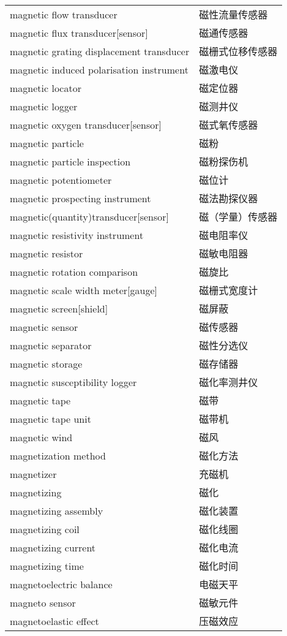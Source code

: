 \documentclass[
]{article}
\begin{document}
\begin{longtable}[]{@{}ll@{}}
magnetic flow transducer & 磁性流量传感器 \\
magnetic flux transducer{[}sensor{]} & 磁通传感器 \\
magnetic grating displacement transducer & 磁栅式位移传感器 \\
magnetic induced polarisation instrument & 磁激电仪 \\
magnetic locator & 磁定位器 \\
magnetic logger & 磁测井仪 \\
magnetic oxygen transducer{[}sensor{]} & 磁式氧传感器 \\
magnetic particle & 磁粉 \\
magnetic particle inspection & 磁粉探伤机 \\
magnetic potentiometer & 磁位计 \\
magnetic prospecting instrument & 磁法勘探仪器 \\
magnetic(quantity)transducer{[}sensor{]} & 磁（学量）传感器 \\
magnetic resistivity instrument & 磁电阻率仪 \\
magnetic resistor & 磁敏电阻器 \\
magnetic rotation comparison & 磁旋比 \\
magnetic scale width meter{[}gauge{]} & 磁栅式宽度计 \\
magnetic screen{[}shield{]} & 磁屏蔽 \\
magnetic sensor & 磁传感器 \\
magnetic separator & 磁性分选仪 \\
magnetic storage & 磁存储器 \\
magnetic susceptibility logger & 磁化率测井仪 \\
magnetic tape & 磁带 \\
magnetic tape unit & 磁带机 \\
magnetic wind & 磁风 \\
magnetization method & 磁化方法 \\
magnetizer & 充磁机 \\
magnetizing & 磁化 \\
magnetizing assembly & 磁化装置 \\
magnetizing coil & 磁化线圈 \\
magnetizing current & 磁化电流 \\
magnetizing time & 磁化时间 \\
magnetoelectric balance & 电磁天平 \\
magneto sensor & 磁敏元件 \\
magnetoelastic effect & 压磁效应 \\

\end{longtable}
\end{document}

